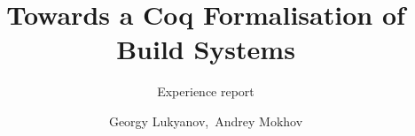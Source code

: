 \documentclass[sigplan,review]{acmart}\settopmatter{printfolios=true,printccs=false,printacmref=false}
\begin{document}
\title[]{Towards a Coq Formalisation of Build Systems}         %
\subtitle{Experience report}                     %



\author{Georgy Lukyanov,~Andrey Mokhov}

\end{document}

